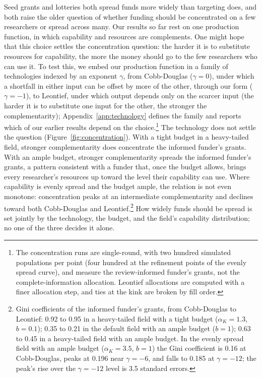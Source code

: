 \documentclass[article, 11pt, reqno]{amsart}
\theoremstyle{named}
\begin{document}
Seed grants and lotteries both spread funds more widely than targeting does, and both raise the older question of whether funding should be concentrated on a few researchers or spread across many. Our results so far rest on one production function, in which capability and resources are complements. One might hope that this choice settles the concentration question: the harder it is to substitute resources for capability, the more the money should go to the few researchers who can use it. To test this, we embed our production function in a family of technologies indexed by an exponent $\gamma$, from Cobb-Douglas ($\gamma = 0$), under which a shortfall in either input can be offset by more of the other, through our form ($\gamma = -1$), to Leontief, under which output depends only on the scarcer input (the harder it is to substitute one input for the other, the stronger the complementarity); Appendix~\ref{app:technology} defines the family and reports which of our earlier results depend on the choice.\footnote{The concentration runs are single-round, with two hundred simulated populations per point (four hundred at the refinement points of the evenly spread curve), and measure the review-informed funder's grants, not the complete-information allocation. Leontief allocations are computed with a finer allocation step, and ties at the kink are broken by fill order.} The technology does not settle the question (Figure~\ref{fig:concentration}). With a tight budget in a heavy-tailed field, stronger complementarity does concentrate the informed funder's grants. With an ample budget, stronger complementarity spreads the informed funder's grants, a pattern consistent with a funder that, once the budget allows, brings every researcher's resources up toward the level their capability can use. Where capability is evenly spread and the budget ample, the relation is not even monotone: concentration peaks at an intermediate complementarity and declines toward both Cobb-Douglas and Leontief.\footnote{Gini coefficients of the informed funder's grants, from Cobb-Douglas to Leontief: 0.92 to 0.95 in a heavy-tailed field with a tight budget ($\alpha_K = 1.3$, $b = 0.1$); 0.35 to 0.21 in the default field with an ample budget ($b = 1$); 0.63 to 0.45 in a heavy-tailed field with an ample budget. In the evenly spread field with an ample budget ($\alpha_K = 3.5$, $b = 1$) the Gini coefficient is 0.16 at Cobb-Douglas, peaks at 0.196 near $\gamma = -6$, and falls to 0.185 at $\gamma = -12$; the peak's rise over the $\gamma = -12$ level is 3.5 standard errors.} How widely funds should be spread is set jointly by the technology, the budget, and the field's capability distribution; no one of the three decides it alone.
\end{document}

